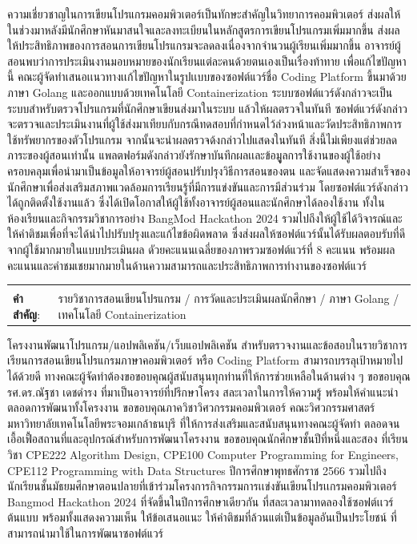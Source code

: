 \documentclass[12pt,one side,openright,a4paper]{cpe-thesis-th}
\begin{document}

\thaiabstract
\justifying
ความเชี่ยวชาญในการเขียนโปรแกรมคอมพิวเตอร์เป็นทักษะสำคัญในวิทยาการคอมพิวเตอร์ ส่งผลให้ในช่วงมาหลังมีนักศึกษาหันมาสนใจและลงทะเบียนในหลักสูตรการเขียนโปรแกรมเพิ่มมากขึ้น ส่งผลให้ประสิทธิภาพของการสอนการเขียนโปรแกรมจะลดลงเนื่องจากจำนวนผู้เรียนเพิ่มมากขึ้น อาจารย์ผู้สอนพบว่าการประเมินงานมอบหมายของนักเรียนแต่ละคนด้วยตนเองเป็นเรื่องท้าทาย เพื่อแก้ไขปัญหานี้ คณะผู้จัดทำเสนอเเนวทางเเก้ไขปัญหาในรูปเเบบของซอฟต์แวร์ชื่อ Coding Platform ขี้นมาด้วยภาษา Golang และออกแบบด้วยเทคโนโลยี Containerization ระบบซอฟต์แวร์ดังกล่าวจะเป็นระบบสำหรับตรวจโปรแกรมที่นักศึกษาเขียนส่งมาในระบบ แล้วให้ผลตรวจในทันที ซอฟต์แวร์ดังกล่าวจะตรวจและประเมินงานที่ผู้ใช้ส่งมาเทียบกับกรณีทดสอบที่กำหนดไว้ล่วงหน้าและวัดประสิทธิภาพการใช้ทรัพยากรของตัวโปรแกรม จากนั้นจะนำผลตรวจด้งกล่าวไปแสดงในทันที สิ่งนี้ไม่เพียงแต่ช่วยลดภาระของผู้สอนเท่านั้น แพลตฟอร์มดังกล่าวยังรักษาบันทึกผลเเละข้อมููลการใช้งานของผู้ใช้อย่างครอบคลุมเพื่อนำมาเป็นข้อมูลให้อาจารย์ผู้สอนปรับปรุงวิธีการสอนของตน และจัดแสดงความสำเร็จของนักศึกษาเพื่อส่งเสริมสภาพแวดล้อมการเรียนรู้ที่มีการแข่งขันและการมีส่วนร่วม โดยซอฟต์แวร์ดังกล่าวได้ถูกติดตั้งใช้งานแล้ว ซึ่งได้เปิดโอกาสให้ผู้ใช้ทั้งอาจารย์ผู้สอนและนักศึกษาได้ลองใช้งาน ทั้งในห้องเรียนและกิจกรรมวิชาการอย่าง BangMod Hackathon 2024 รวมไปถึงให้ผู้ใช้ได้วิจารณ์และให้คำติชมเพื่อที่จะได้นำไปปรับปรุงและแก้ไขข้อผิดพลาด ซึ่งส่งผลให้ซอฟต์แวร์นั้นได้รับผลตอบรับที่ดีจากผู้ใช้มากมายในแบบประเมินผล ดัวยคะแนนเฉลี่ยของภาพรวมซอฟต์แวร์ที่ 8 คะแนน พร้อมผลคะแนนและคำชมเชยมากมายในด้านความสามารถและประสิทธิภาพการทำงานของซอฟต์แวร์

\justifying
\begin{tabular*}{\textwidth}{@{}lp{}}
& \\
\textbf{คำสำคัญ}: & รายวิชาการสอนเขียนโปรแกรม / การวัดและประเมินผลนักศึกษา / ภาษา Golang / เทคโนโลยี Containerization
\end{tabular*}
\vspace{1mm}
\endabstract

\preface
โครงงานพัฒนาโปรแกรม/แอปพลิเคชัน/เว็บแอปพลิเคชัน สำหรับตรวจงานและข้อสอบในรายวิชาการเรียนการสอนเขียนโปรแกรมภาษาคอมพิวเตอร์ หรือ Coding Platform สามารถบรรลุเป้าหมายไปได้ด้วยดี ทางคณะผู้จัดทำต้องขอขอบคุณผู้สนับสนุนทุกท่านที่ให้การช่วยเหลือในด้านต่าง ๆ ขอขอบคุณ รศ.ดร.ณัฐชา เดชดำรง ที่มาเป็นอาจารย์ที่ปรึกษาโครง สละเวลาในการให้ความรู้ พร้อมให้คำแนะนำตลอดการพัฒนาทั้งโครงงาน ขอขอบคุณภาควิชาวิศวกรรมคอมพิวเตอร์ คณะวิศวกรรมศาสตร์ มหาวิทยาลัยเทคโนโลยีพระจอมเกล้าธนบุรี ที่ให้การส่งเสริมและสนับสนุนทางคณะผู้จัดทำ ตลอดจนเอื้อเฟื้อสถานที่และอุปกรณ์สำหรับการพัฒนาโครงงาน ขอขอบคุณนักศึกษาชั้นปีที่หนึ่งและสอง ที่เรียนวิชา CPE222 Algorithm Design, CPE100 Computer Programming for Engineers, CPE112 Programming with Data Structures ปีการศึกษาพุทธศักราช 2566 รวมไปถึงนักเรียนชั้นมัธยมศึกษาตอนปลายที่เข้าร่วมโครงการกิจกรรมการเเข่งขันเขียนโปรเเกรมคอมพิวเตอร์ Bangmod Hackathon 2024 ที่จัดขึ้นในปีการศึกษาเดียวกัน ที่สละเวลามาทดลองใช้ซอฟต์เเวร์ต้นแบบ พร้อมทั้งแสดงความเห็น ให้่ข้อเสนอแนะ ให้คำติชมที่ล้วนแต่เป็นข้อมูลอันเป็นประโยชน์ ที่สามารถนำมาใช้ในการพัฒนาซอฟต์แวร์
\end{document}
